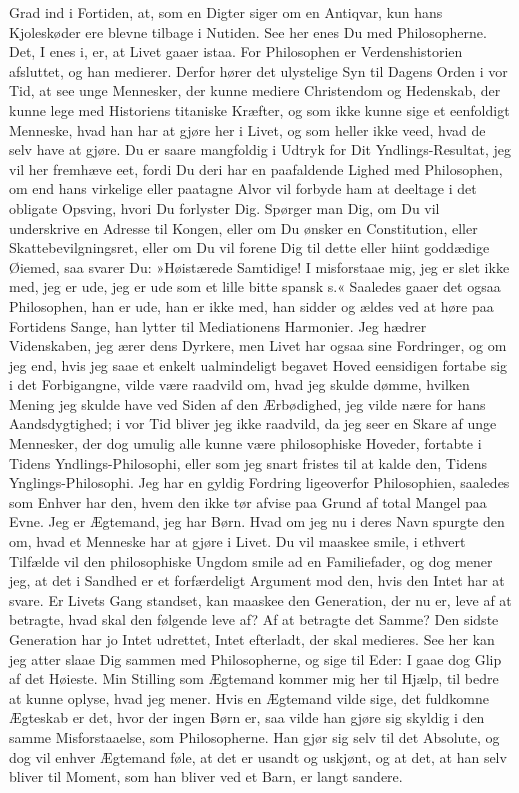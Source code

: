 \documentclass[12pt,a4paper]{article}
\begin{document}
Grad ind i Fortiden, at, som en Digter siger om en Antiqvar, kun hans Kjoleskøder ere blevne tilbage i Nutiden. See her enes Du med Philosopherne. Det, I enes i, er, at Livet gaaer istaa. For Philosophen er Verdenshistorien afsluttet, og han medierer. Derfor hører det ulystelige Syn til Dagens Orden i vor Tid, at see unge Mennesker, der kunne mediere Christendom og Hedenskab, der kunne lege med Historiens titaniske Kræfter, og som ikke kunne sige et eenfoldigt Menneske, hvad han har at gjøre her i Livet, og som heller ikke veed, hvad de selv have at gjøre. Du er saare mangfoldig i Udtryk for Dit Yndlings-Resultat, jeg vil her fremhæve eet, fordi Du deri har en paafaldende Lighed med Philosophen, om end hans virkelige eller paatagne Alvor vil forbyde ham at deeltage i det obligate Opsving, hvori Du forlyster Dig. Spørger man Dig, om Du vil underskrive en Adresse til Kongen, eller om Du ønsker en Constitution, eller Skattebevilgningsret, eller om Du vil forene Dig til dette eller hiint goddædige Øiemed, saa svarer Du: »Høistærede Samtidige! I misforstaae mig, jeg er slet ikke med, jeg er ude, jeg er ude som et lille bitte spansk s.« Saaledes gaaer det ogsaa Philosophen, han er ude, han er ikke med, han sidder og ældes ved at høre paa Fortidens Sange, han lytter til Mediationens Harmonier. Jeg hædrer Videnskaben, jeg ærer dens Dyrkere, men Livet har ogsaa sine Fordringer, og om jeg end, hvis jeg saae et enkelt ualmindeligt begavet Hoved eensidigen fortabe sig i det Forbigangne, vilde være raadvild om, hvad jeg skulde dømme, hvilken Mening jeg skulde have ved Siden af den Ærbødighed, jeg vilde nære for hans Aandsdygtighed; i vor Tid bliver jeg ikke raadvild, da jeg seer en Skare af unge Mennesker, der dog umulig alle kunne være philosophiske Hoveder, fortabte i Tidens Yndlings-Philosophi, eller som jeg snart fristes til at kalde den, Tidens Ynglings-Philosophi. Jeg har en gyldig Fordring ligeoverfor Philosophien, saaledes som Enhver har den, hvem den ikke tør afvise paa Grund af total Mangel paa Evne. Jeg er Ægtemand, jeg har Børn. Hvad om jeg nu i deres Navn spurgte den om, hvad et Menneske har at gjøre i Livet. Du vil maaskee smile, i ethvert Tilfælde vil den philosophiske Ungdom smile ad en Familiefader, og dog mener jeg, at det i Sandhed er et forfærdeligt Argument mod den, hvis den Intet har at svare. Er Livets Gang standset, kan maaskee den Generation, der nu er, leve af at betragte, hvad skal den følgende leve af? Af at betragte det Samme? Den sidste Generation har jo Intet udrettet, Intet efterladt, der skal medieres. See her kan jeg atter slaae Dig sammen med Philosopherne, og sige til Eder: I gaae dog Glip af det Høieste. Min Stilling som Ægtemand kommer mig her til Hjælp, til bedre at kunne oplyse, hvad jeg mener. Hvis en Ægtemand vilde sige, det fuldkomne Ægteskab er det, hvor der ingen Børn er, saa vilde han gjøre sig skyldig i den samme Misforstaaelse, som Philosopherne. Han gjør sig selv til det Absolute, og dog vil enhver Ægtemand føle, at det er usandt og uskjønt, og at det, at han selv bliver til Moment, som han bliver ved et Barn, er langt sandere.
\end{document}
